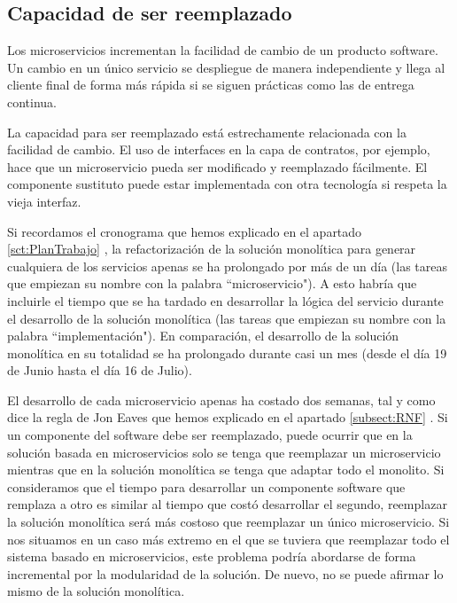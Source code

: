 \documentclass[11pt,spanish,listoffigures]{tfgetsinf}
\begin{document}
\subsection{Capacidad de ser reemplazado}

Los microservicios incrementan la facilidad de cambio de un producto software. Un cambio en un único servicio se despliegue de manera independiente y llega al cliente final de forma más rápida si se siguen prácticas como las de entrega continua.

La capacidad para ser reemplazado está estrechamente relacionada con la facilidad de cambio. El uso de interfaces en la capa de contratos, por ejemplo, hace que un microservicio pueda ser modificado y reemplazado fácilmente. El componente sustituto puede estar implementada con otra tecnología si respeta la vieja interfaz. 

Si recordamos el cronograma que hemos explicado en el apartado \ref{sct:PlanTrabajo} , la refactorización de la solución monolítica para generar cualquiera de los servicios apenas se ha prolongado por más de un día (las tareas que empiezan su nombre con la palabra ``microservicio"). A esto habría que incluirle el tiempo que se ha tardado en desarrollar la lógica del servicio durante el desarrollo de la solución monolítica (las tareas que empiezan su nombre con la palabra ``implementación"). En comparación, el desarrollo de la solución monolítica en su totalidad se ha prolongado durante casi un mes (desde el día 19 de Junio hasta el día 16 de Julio).

El desarrollo de cada microservicio apenas ha costado dos semanas, tal y como dice la regla de Jon Eaves que hemos explicado en el apartado \ref{subsect:RNF} . Si un componente del software debe ser reemplazado, puede ocurrir que en la solución basada en microservicios solo se tenga que reemplazar un microservicio mientras que en la solución monolítica se tenga que adaptar todo el monolito. Si consideramos que el tiempo para desarrollar un componente software que remplaza a otro es similar al tiempo que costó desarrollar el segundo, reemplazar la solución monolítica será más costoso que reemplazar un único microservicio. Si nos situamos en un caso más extremo en el que se tuviera que reemplazar todo el sistema basado en microservicios, este problema podría abordarse de forma incremental por la modularidad de la solución. De nuevo, no se puede afirmar lo mismo de la solución monolítica.
\end{document}
